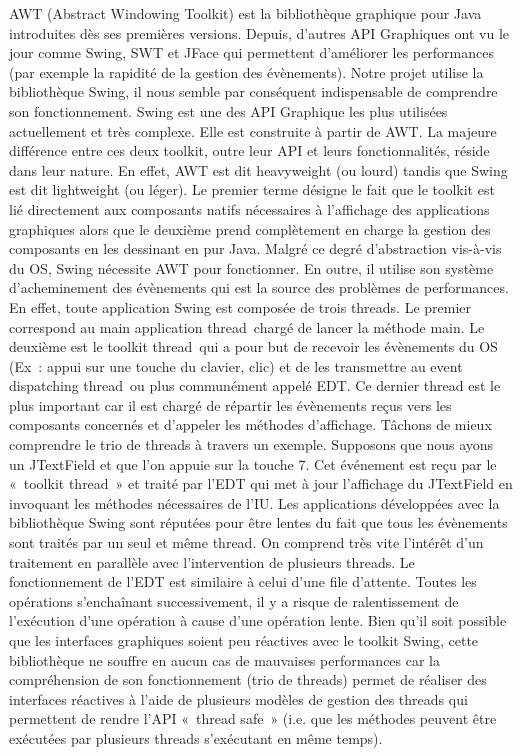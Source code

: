 AWT (Abstract Windowing Toolkit) est la bibliothèque graphique pour Java introduites dès ses premières versions. Depuis, d’autres API Graphiques ont vu le jour comme Swing, SWT et JFace qui permettent d’améliorer les performances (par exemple la rapidité de la gestion des évènements). Notre projet utilise la bibliothèque Swing, il nous semble par conséquent indispensable de comprendre son fonctionnement.
Swing est une des API Graphique les plus utilisées actuellement et très complexe. Elle est construite à partir de AWT. La majeure différence entre ces deux toolkit, outre leur API et leurs fonctionnalités, réside dans leur nature. En effet, AWT est dit heavyweight (ou lourd) tandis que Swing est dit lightweight (ou léger). Le premier terme désigne le fait que le toolkit est lié directement aux composants natifs nécessaires à l’affichage des applications graphiques alors que le deuxième prend complètement en charge la gestion des composants en les dessinant en pur Java.
Malgré ce degré d’abstraction vis-à-vis du OS, Swing nécessite AWT pour fonctionner. En outre, il utilise son système d’acheminement des évènements qui est la source des problèmes de performances. En effet, toute application Swing est composée de trois threads.
Le premier correspond au main application thread chargé de lancer la méthode main. Le deuxième est le toolkit thread qui a pour but de recevoir les évènements du OS (Ex : appui sur une touche du clavier, clic) et de les transmettre au event dispatching thread ou plus communément appelé EDT. Ce dernier thread est le plus important car il est chargé de répartir les évènements reçus vers les composants concernés et d’appeler les méthodes d’affichage.
Tâchons de mieux comprendre le trio de threads à travers un exemple. Supposons que nous ayons un JTextField et que l’on appuie sur la touche 7. Cet événement est reçu par le « toolkit thread » et traité par l’EDT qui met à jour l’affichage du JTextField en invoquant les méthodes nécessaires de l’IU.
Les applications développées avec la bibliothèque Swing sont réputées pour être lentes du fait que tous les évènements sont traités par un seul et même thread. On comprend très vite l’intérêt d’un traitement en parallèle avec l’intervention de plusieurs threads. Le fonctionnement de l’EDT est similaire à celui d’une file d’attente. Toutes les opérations s’enchaînant successivement, il y a risque de ralentissement de l’exécution d’une opération à cause d’une opération lente. Bien qu’il soit possible que les interfaces graphiques soient peu réactives avec le toolkit Swing, cette bibliothèque ne souffre en aucun cas de mauvaises performances car la compréhension de son fonctionnement (trio de threads) permet de réaliser des interfaces réactives à l’aide de plusieurs modèles de gestion des threads qui permettent de rendre l’API « thread safe » (i.e. que les méthodes peuvent être exécutées par plusieurs threads s’exécutant en même temps).

